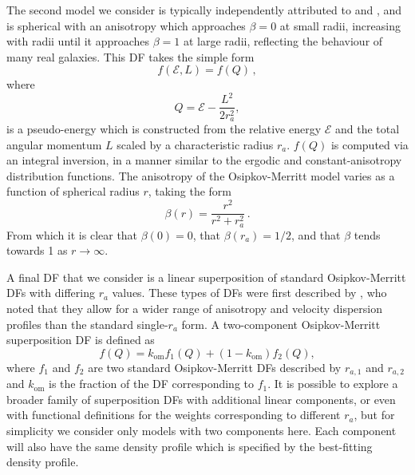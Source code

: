 The second model we consider is typically independently attributed to \textcite{osipkov79} and \textcite{merritt85}, and is spherical with an anisotropy which approaches $\beta = 0$ at small radii, increasing with radii until it approaches $\beta = 1$ at large radii, reflecting the behaviour of many real galaxies. This DF takes the simple form
\begin{equation}
    \label{ch4:eq:osipkov-merritt-df}
    f(\mathcal{E},L) = f(Q)\,,
\end{equation}
\noindent where
\begin{equation}
    \label{ch4:eq:osipkov-merritt-Q}
    Q = \mathcal{E} - \frac{L^{2}}{2r_{a}^{2}},
\end{equation}
\noindent is a pseudo-energy which is constructed from the relative energy $\mathcal{E}$ and the total angular momentum $L$ scaled by a characteristic radius $r_{a}$. $f(Q)$ is computed via an integral inversion, in a manner similar to the ergodic and constant-anisotropy distribution functions. The anisotropy of the Osipkov-Merritt model varies as a function of spherical radius $r$, taking the form
\begin{equation}
    \label{ch4:eq:beta-osipkov-merritt}
    \beta(r) = \frac{r^{2}}{r^{2} + r_{a}^{2}}\,.
\end{equation}
\noindent From which it is clear that $\beta(0)=0$, that $\beta(r_{a})=1/2$, and that $\beta$ tends towards 1 as $r \rightarrow \infty$.

A final DF that we consider is a linear superposition of standard Osipkov-Merritt DFs with differing $r_{a}$ values. These types of DFs were first described by \textcite{merritt85}, who noted that they allow for a wider range of anisotropy and velocity dispersion profiles than the standard single-$r_{a}$ form. A two-component Osipkov-Merritt superposition DF is defined as
\begin{equation}
    \label{ch4:eq:osipkov-merritt-superposition-df}
    f(Q) = k_\mathrm{om}f_{1}(Q) + (1-k_\mathrm{om})f_{2}(Q),
\end{equation}
\noindent where $f_{1}$ and $f_{2}$ are two standard Osipkov-Merritt DFs described by $r_{a,1}$ and $r_{a,2}$ and $k_\mathrm{om}$ is the fraction of the DF corresponding to $f_{1}$. It is possible to explore a broader family of superposition DFs with additional linear components, or even with functional definitions for the weights corresponding to different $r_{a}$, but for simplicity we consider only models with two components here. Each component will also have the same density profile which is specified by the best-fitting density profile.

